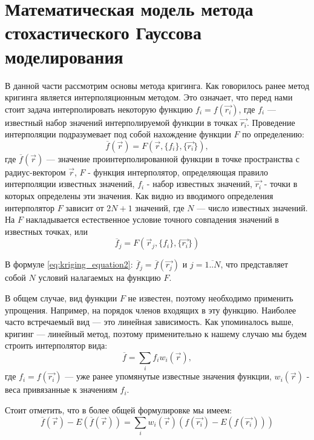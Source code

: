 \section{Математическая модель метода стохастического Гауссова моделирования} \label{sect1_2}
В данной части рассмотрим основы метода кригинга. Как говорилось ранее метод кригинга является интерполяционным методом. Это означает, что перед нами стоит задача интерполировать некоторую функцию $f_i = f(\vec{r_i})$, где $f_i$ — известный набор значений интерполируемой функции в точках $\vec{r_i}$. Проведение интерполяции подразумевает под собой нахождение функции $F$ по определению:
\begin{equation}
  \label{eq:kriging_equation1}
  \overline{f}(\vec{r}) = F(\vec{r}, \{f_i\}, \{\vec{r_i}\}),
\end{equation}
\noindent
где $\overline{f}(\vec{r})$ — значение проинтерполированной функции в точке пространства с радиус-вектором $\vec{r}$, $F$ - функция интерполятор, определяющая правило интерполяции известных значений, ${f_i}$ - набор известных значений, ${\vec{r_i}}$ - точки в которых определены эти значения. Как видно из вводимого определения интерполятор $F$ зависит от $2N + 1$ значений, где $N$ — число известных значений. На $F$ накладывается естественное условие точного совпадения значений в известных точках, или
\begin{equation}
  \label{eq:kriging_equation2}
  \overline{f}_j =  F(\vec{r}_j, \{f_i\}, \{\vec{r_i}\})
\end{equation}

В формуле \eqref{eq:kriging_equation2}: $\overline{f}_j = \overline{f}(\vec{r_j})$ и $j = \overline{1..N}$, что представляет собой $N$ условий налагаемых на функцию $F$.

В общем случае, вид функции $F$ не известен, поэтому необходимо применить упрощения. Например, на порядок членов входящих в эту функцию. Наиболее часто встречаемый вид — это линейная зависимость. Как упоминалось выше, кригинг — линейный метод, поэтому применительно к нашему случаю мы будем строить интерполятор вида:
\begin{equation}
  \label{eq:kriging_equation3}
  \overline{f} =  \sum_{i} f_i w_i(\vec{r}),
\end{equation}
\noindent
где $f_i = f(\vec{r_i})$ — уже ранее упомянутые известные значения функции, $w_i(\vec{r})$ - веса привязанные к значениям $f_i$.

Стоит отметить, что в более общей формулировке мы имеем:
\begin{equation}
  \label{eq:kriging_equation4}
  \overline{f}(\vec{r}) - E(\overline{f}(\vec{r})) =  \sum_{i} w_i(\vec{r}) (f(\vec{r_i}) - E(f(\vec{r_i})))
\end{equation}

